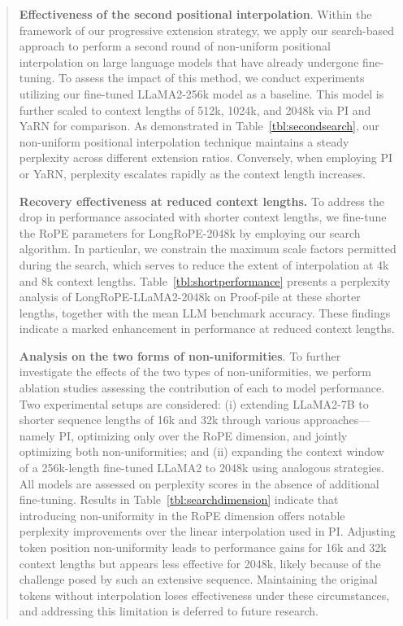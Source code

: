 \begin{abstract}
\textbf{Effectiveness of the second positional interpolation}. Within the framework of our progressive extension strategy, we apply our search-based approach to perform a second round of non-uniform positional interpolation on large language models that have already undergone fine-tuning. To assess the impact of this method, we conduct experiments utilizing our fine-tuned LLaMA2-256k model as a baseline. This model is further scaled to context lengths of 512k, 1024k, and 2048k via PI and YaRN for comparison. As demonstrated in Table~\ref{tbl:secondsearch}, our non-uniform positional interpolation technique maintains a steady perplexity across different extension ratios. Conversely, when employing PI or YaRN, perplexity escalates rapidly as the context length increases.

\textbf{Recovery effectiveness at reduced context lengths.} To address the drop in performance associated with shorter context lengths, we fine-tune the RoPE parameters for LongRoPE-2048k by employing our search algorithm. In particular, we constrain the maximum scale factors permitted during the search, which serves to reduce the extent of interpolation at 4k and 8k context lengths. Table~\ref{tbl:shortperformance} presents a perplexity analysis of LongRoPE-LLaMA2-2048k on Proof-pile at these shorter lengths, together with the mean LLM benchmark accuracy. These findings indicate a marked enhancement in performance at reduced context lengths.

\textbf{Analysis on the two forms of non-uniformities}. To further investigate the effects of the two types of non-uniformities, we perform ablation studies assessing the contribution of each to model performance. Two experimental setups are considered: (i) extending LLaMA2-7B to shorter sequence lengths of 16k and 32k through various approaches—namely PI, optimizing only over the RoPE dimension, and jointly optimizing both non-uniformities; and (ii) expanding the context window of a 256k-length fine-tuned LLaMA2 to 2048k using analogous strategies. All models are assessed on perplexity scores in the absence of additional fine-tuning. Results in Table~\ref{tbl:searchdimension} indicate that introducing non-uniformity in the RoPE dimension offers notable perplexity improvements over the linear interpolation used in PI. Adjusting token position non-uniformity leads to performance gains for 16k and 32k context lengths but appears less effective for 2048k, likely because of the challenge posed by such an extensive sequence. Maintaining the original tokens without interpolation loses effectiveness under these circumstances, and addressing this limitation is deferred to future research.


\end{abstract}
